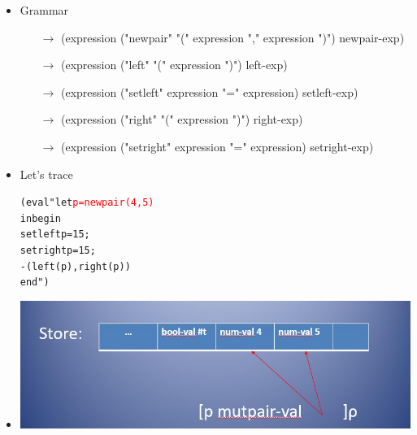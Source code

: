\documentclass{beamer}
\newcommand{\arrow}{\(\rightarrow\)}
\begin{document}
\begin{frame}[fragile]
\begin{scriptsize}
\begin{itemize}
\item<1-> Grammar
\begin{itemize}
\item[\arrow] (expression ("newpair" "(" expression "," expression ")") newpair-exp)

\item[\arrow] (expression ("left" "(" expression ")") left-exp)

\item[\arrow] (expression ("setleft" expression "=" expression) setleft-exp)

\item[\arrow] (expression ("right" "(" expression ")") right-exp)

\item[\arrow] (expression ("setright" expression "=" expression) setright-exp)
\end{itemize}

\end{itemize}
\end{scriptsize}
\end{frame}

\begin{frame}[fragile]
\begin{scriptsize}
\begin{itemize}
\item<1-> Let's trace
\begin{alltt}
(eval "let \textcolor{red}{p = newpair(4, 5)}
       in begin
            setleft p = 15;
           	setright p = 15;
           	-(left(p), right(p))
          end")
\end{alltt}

\item<2->
\begin{center}
\includegraphics[scale=0.5]{mut-pairs1.jpg}
\end{center}

\end{itemize}
\end{scriptsize}
\end{frame}
\end{document}
